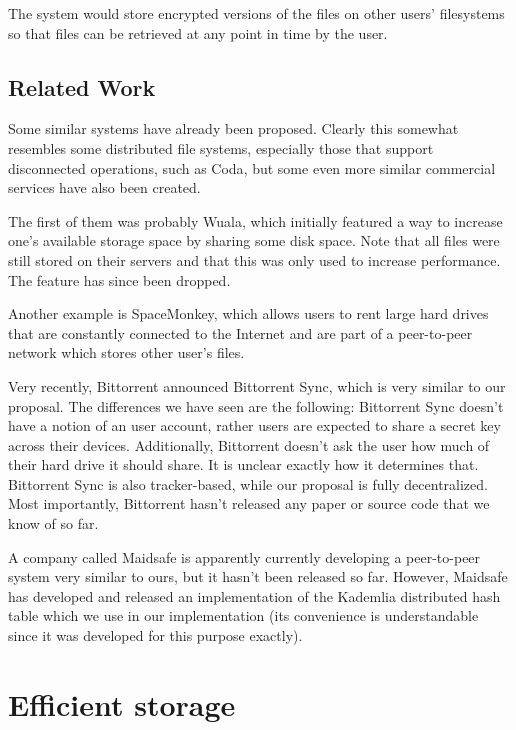 \documentclass{acm_}
\begin{document}
The system would store encrypted versions of the files on other users' filesystems so that files can be retrieved at any point in time by the user.

\subsection{Related Work}

Some similar systems have already been proposed. Clearly this somewhat resembles some distributed file systems, especially those that support disconnected operations, such as Coda\cite{coda}, but some even more similar commercial services have also been created.

The first of them was probably Wuala\cite{wuala:measurement}, which initially featured a way to increase one's available storage space by sharing some disk space. Note that all files were still stored on their servers and that this was only used to increase performance. The feature has since been dropped.

Another example is SpaceMonkey\cite{spacemonkey}, which allows users to rent large hard drives that are constantly connected to the Internet and are part of a peer-to-peer network which stores other user's files.

Very recently, Bittorrent announced Bittorrent Sync\cite{sync}, which is very similar to our proposal. The differences we have seen are the following: Bittorrent Sync doesn't have a notion of an user account, rather users are expected to share a secret key across their devices. Additionally, Bittorrent doesn't ask the user how much of their hard drive it should share. It is unclear exactly how it determines that. Bittorrent Sync is also tracker-based, while our proposal is fully decentralized. Most importantly, Bittorrent hasn't released any paper or source code that we know of so far.

A company called Maidsafe is apparently currently developing a peer-to-peer system very similar to ours\cite{maidsafe_site}, but it hasn't been released so far. However, Maidsafe has developed and released an implementation of the Kademlia distributed hash table\cite{maidsafe_dht} which we use in our implementation (its convenience is understandable since it was developed for this purpose exactly).

\section{Efficient storage}
\end{document}
